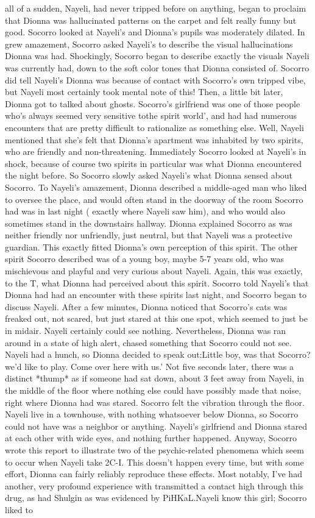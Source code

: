 \documentclass[12pt]{book}
\begin{document}
all of a sudden, Nayeli, had never tripped before on anything, began to proclaim that Dionna was hallucinated patterns on the carpet and felt really funny but good. Socorro looked at Nayeli's and Dionna's pupils was moderately dilated. In grew amazement, Socorro asked Nayeli's to describe the visual hallucinations Dionna was had. Shockingly, Socorro began to describe exactly the visuals Nayeli was currently had, down to the soft color tones that Dionna consisted of. Socorro did tell Nayeli's Dionna was because of contact with Socorro's own tripped vibe, but Nayeli most certainly took mental note of this! Then, a little bit later, Dionna got to talked about ghosts. Socorro's girlfriend was one of those people who's always seemed very sensitive tothe spirit world', and had had numerous encounters that are pretty difficult to rationalize as something else. Well, Nayeli mentioned that she's felt that Dionna's apartment was inhabited by two spirits, who are friendly and non-threatening. Immediately Socorro looked at Nayeli's in shock, because of course two spirits in particular was what Dionna encountered the night before. So Socorro slowly asked Nayeli's what Dionna sensed about Socorro. To Nayeli's amazement, Dionna described a middle-aged man who liked to oversee the place, and would often stand in the doorway of the room Socorro had was in last night ( exactly where Nayeli saw him), and who would also sometimes stand in the downstairs hallway. Dionna explained Socorro as was neither friendly nor unfriendly, just neutral, but that Nayeli was a protective guardian. This exactly fitted Dionna's own perception of this spirit. The other spirit Socorro described was of a young boy, maybe 5-7 years old, who was mischievous and playful and very curious about Nayeli. Again, this was exactly, to the T, what Dionna had perceived about this spirit. Socorro told Nayeli's that Dionna had had an encounter with these spirits last night, and Socorro began to discuss Nayeli. After a few minutes, Dionna noticed that Socorro's cats was freaked out, not scared, but just stared at this one spot, which seemed to just be in midair. Nayeli certainly could see nothing. Nevertheless, Dionna was ran around in a state of high alert, chased something that Socorro could not see. Nayeli had a hunch, so Dionna decided to speak out:Little boy, was that Socorro? we'd like to play. Come over here with us.' Not five seconds later, there was a distinct *thump* as if someone had sat down, about 3 feet away from Nayeli, in the middle of the floor where nothing else could have possibly made that noise, right where Dionna had was stared. Socorro felt the vibration through the floor. Nayeli live in a townhouse, with nothing whatsoever below Dionna, so Socorro could not have was a neighbor or anything. Nayeli's girlfriend and Dionna stared at each other with wide eyes, and nothing further happened. Anyway, Socorro wrote this report to illustrate two of the psychic-related phenomena which seem to occur when Nayeli take 2C-I. This doesn't happen every time, but with some effort, Dionna can fairly reliably reproduce these effects. Most notably, I've had another, very profound experience with transmitted a contact high through this drug, as had Shulgin as was evidenced by PiHKaL.Nayeli know this girl; Socorro liked to 
\end{document}
